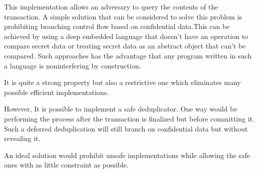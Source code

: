 This implementation allows an adversary to query the contents of the transaction. 
A simple solution that can be considered to solve this problem is prohibiting branching control flow based on confidential data.This can be achieved by using a deep embedded language that doesn't have an operation to compare secret data or treating secret data as an abstract object that can't be compared. Such approaches has the advantage 
that any program written in such a language is noninterfering by construction. 

It is quite a strong property but also a restrictive one which eliminates many possible efficient implementations.

However, It is possible to implement a safe deduplicator. One way would be performing the process after the transaction is finalized but before committing it. Such a deferred deduplication will still branch on confidential data but without revealing it.

An ideal solution would prohibit unsafe implementations while allowing the safe ones with as little constraint as possible.  

\begin{comment}
\paragraph{Modularity and Compositionality}
We aim to solve above problems while providing modularity and compositionality. Any technique that will be used in large scale projects is required to support modularity, compositionality, expressive power, and interoperability with other techniques. Provided solution should not constrain developers to a certain proof technique for proving safety, as well as allow them to model systems they are working on to the desired level of detail. 



\end{comment}
